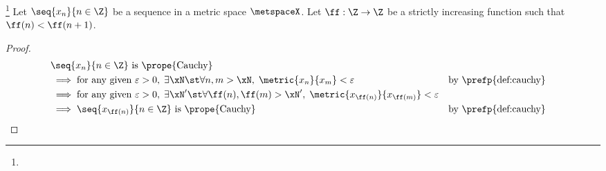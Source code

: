 \begin{proposition}
\footnote{
  }
Let $\seq{x_n}{n\in\Z}$ be a sequence in a metric space $\metspaceX$.
Let $\ff:\Z\to\Z$ be a strictly increasing function such that $\ff(n)<\ff(n+1)$.
\end{proposition}
\begin{proof}
\begin{align*}
  &\text{$\seq{x_n}{n\in\Z}$ is \prope{Cauchy}}
  \\&\implies \text{for any given } \varepsilon>0,\; \exists\xN \st \forall n,m>\xN,\; \metric{x_n}{x_m}<\varepsilon
    &&        \text{by \prefp{def:cauchy}}
  \\&\implies \text{for any given } \varepsilon>0,\; \exists\xN' \st \forall \ff(n),\ff(m)>\xN',\; \metric{x_{\ff(n)}}{x_{\ff(m)}}<\varepsilon
  \\&\implies \seq{x_{\ff(n)}}{n\in\Z} \text{ is \prope{Cauchy}}
    &&        \text{by \prefp{def:cauchy}}
\end{align*}
\end{proof}

